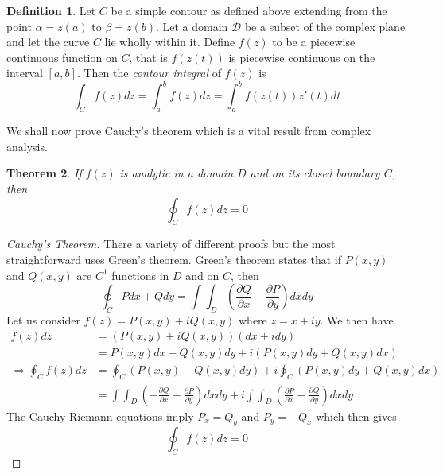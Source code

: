 \documentclass{report}
\newtheorem{theorem}{Theorem}[chapter]
\theoremstyle{definition}
\newtheorem{definition}[theorem]{Definition}
\theoremstyle{remark}
\newcommand{\pd}[2]{\frac{\partial #1}{\partial#2}}
\newcommand{\pull}{\! \! \!}
\begin{document}
\begin{definition}
    Let $C$ be a simple contour as defined above extending from the point $\alpha = z(a)$ to $\beta =z(b)$. Let a domain $\mathcal{D}$ be a subset of the complex plane and let the curve $C$ lie wholly within it. Define $f(z)$ to be a piecewise continuous function on $C$, that is $f(z(t))$ is piecewise continuous on the interval $[a,b]$. Then the \emph{contour integral} of $f(z)$ is 
    \begin{equation*}
        \int_C f(z)dz = \int^b_a f(z)dz = \int^b_a f(z(t))z'(t)dt
    \end{equation*}
\end{definition}

We shall now prove Cauchy's theorem which is a vital result from complex analysis. 
\begin{theorem}
    If $f(z)$ is analytic in a domain $D$ and on its closed boundary $C$, then 
    \begin{equation*}
        \oint_C f(z)dz=0
    \end{equation*}
\end{theorem}
\begin{proof}[Cauchy's Theorem]
    There a variety of different proofs but the most straightforward uses Green's theorem. Green's theorem states that if $P(x,y)$ and $Q(x,y)$ are $C^1$ functions in $D$ and on $C$, then 
    \begin{equation*}
        \oint_C Pdx + Qdy = \int\pull\int_D\left( \pd{Q}{x}-\pd{P}{y}\right)dxdy
    \end{equation*}
    Let us consider $f(z) = P(x,y)+iQ(x,y)$ where $z=x+iy$. We then have 
    \begin{equation*}
        \begin{split}
            f(z)dz &=(P(x,y)+iQ(x,y))(dx+idy) \\
            &=P(x,y)dx - Q(x,y)dy + i(P(x,y)dy+Q(x,y)dx) \\
            \Rightarrow \oint_C f(z)dz&=\oint_C(P(x,y)-Q(x,y)dy) + i\oint_C(P(x,y)dy+Q(x,y)dx) \\
            &=\int \pull \int_D\left( -\pd{Q}{x}-\pd{P}{y}\right) dxdy +i\int\pull \int_D\left( \pd{P}{x}-\pd{Q}{y} \right)dxdy
        \end{split}
    \end{equation*}
    The Cauchy-Riemann equations imply $P_x=Q_y$ and $P_y=-Q_x$ which then gives 
    \begin{equation*}
        \oint_C f(z)dz = 0
    \end{equation*}
\end{proof}
\end{document}
